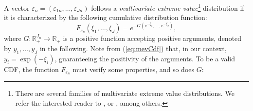 \documentclass[12pt,a4paper]{article}
\newcommand{\req}[1]{(\ref{#1})}
\newcommand{\R}{\mathbb{R}}
\begin{document}
A vector $\varepsilon_n = (\varepsilon_{1n},\ldots,\varepsilon_{Jn})$
follows a \emph{multivariate extreme value}\footnote{There are several families of multivariate
  extreme value distributions. We refer the interested reader to
  ,    or , among others.}  distribution if it is characterized by the following cumulative distribution function:
\begin{equation}
\label{eq:mevCdf}
F_{\varepsilon_n}(\xi_{1},\ldots,\xi_{J}) =
e^{-G(e^{-\xi_{1}},\ldots,e^{-\xi_{J}})},
\end{equation}
where $G:\R_+^{J_n} \to \R_+$ is a positive function accepting
positive arguments, denoted by $y_{1},\ldots,y_{J}$ in the following. Note from  \req{eq:mevCdf} that, in our context, $y_{i} = \exp(-\xi_{i})$, guaranteeing the positivity of the arguments. 
To be a valid CDF, the function $F_{\varepsilon_n}$ must verify some
properties, and so does $G$:
\end{document}
